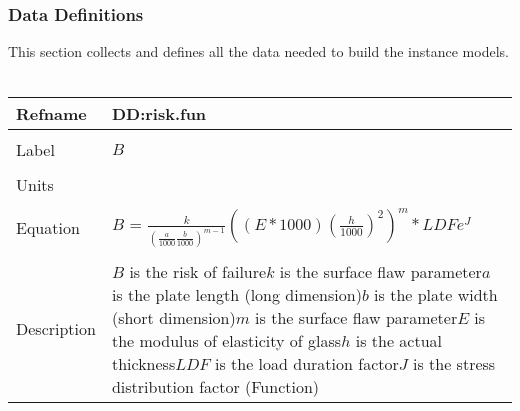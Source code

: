 \documentclass[12pt]{article}
\begin{document}
\subsubsection{Data Definitions}
\label{Sec:DD}
This section collects and defines all the data needed to build the instance models.
~\newline
\noindent \begin{minipage}{\textwidth}
\begin{tabular}{p{} p{}}
\toprule \textbf{Refname} & \textbf{DD:risk.fun}
\label{DD:risk.fun}
\\ \midrule \\
Label & $B$
\\ \midrule \\
Units & 
\\ \midrule \\
Equation & $B$ = $\frac{k}{(\frac{a}{1000}\frac{b}{1000})^{m-1}}((E*1000)(\frac{h}{1000})^{2})^{m}*LDFe^{J}$
\\ \midrule \\
Description & $B$ is the risk of failure\newline$k$ is the surface flaw parameter\newline$a$ is the plate length (long dimension)\newline$b$ is the plate width (short dimension)\newline$m$ is the surface flaw parameter\newline$E$ is the modulus of elasticity of glass\newline$h$ is the actual thickness\newline$LDF$ is the load duration factor\newline$J$ is the stress distribution factor (Function)
\\ \bottomrule \end{tabular}
\end{minipage}\\
~\newline
\end{document}
